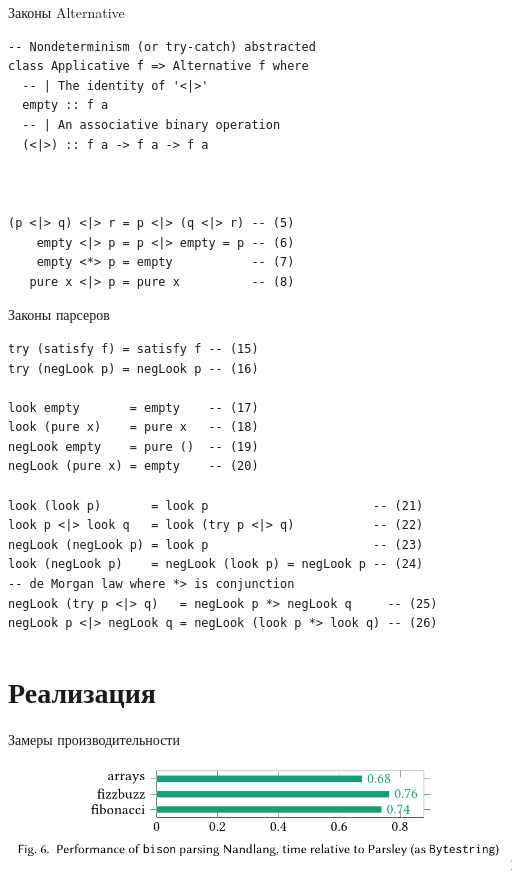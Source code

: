 \documentclass[aspectratio=169
  , xcolor={svgnames}
  , hyperref={ colorlinks,citecolor=Blue
             , linkcolor=DarkRed,urlcolor=DarkBlue}
  , usenames, dvipsnames
  , russian
  ]{beamer}
\begin{document}
\begin{frame}[fragile]{Законы Alternative}
\begin{verbatim}
-- Nondeterminism (or try-catch) abstracted
class Applicative f => Alternative f where
  -- | The identity of '<|>'
  empty :: f a
  -- | An associative binary operation
  (<|>) :: f a -> f a -> f a



(p <|> q) <|> r = p <|> (q <|> r) -- (5)
    empty <|> p = p <|> empty = p -- (6)
    empty <*> p = empty           -- (7)
   pure x <|> p = pure x          -- (8)
\end{verbatim}
\end{frame}



\begin{frame}[fragile]{Законы парсеров}
\begin{verbatim}
try (satisfy f) = satisfy f -- (15)
try (negLook p) = negLook p -- (16)

look empty       = empty    -- (17)
look (pure x)    = pure x   -- (18)
negLook empty    = pure ()  -- (19)
negLook (pure x) = empty    -- (20)

look (look p)       = look p                       -- (21)
look p <|> look q   = look (try p <|> q)           -- (22)
negLook (negLook p) = look p                       -- (23)
look (negLook p)    = negLook (look p) = negLook p -- (24)
-- de Morgan law where *> is conjunction
negLook (try p <|> q)   = negLook p *> negLook q     -- (25)
negLook p <|> negLook q = negLook (look p *> look q) -- (26)
\end{verbatim}
\end{frame}

\section{Реализация}


%
\begin{frame}[fragile]{Замеры производительности}
\includegraphics[scale=.6]{pictures/benchmark1Screen.png}
\end{frame}
\end{document}

